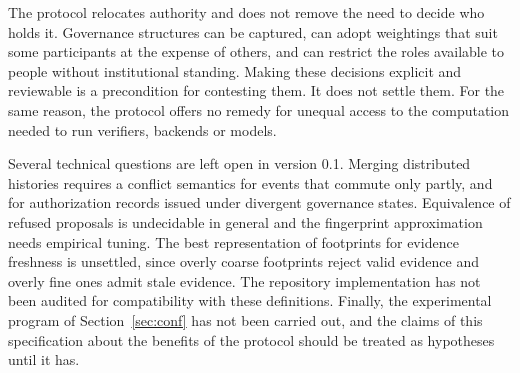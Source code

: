 \documentclass[11pt]{article}
\theoremstyle{remark}
\begin{document}
The protocol relocates authority and does not remove the need to decide who holds it. Governance structures can be captured, can adopt weightings that suit some participants at the expense of others, and can restrict the roles available to people without institutional standing. Making these decisions explicit and reviewable is a precondition for contesting them. It does not settle them. For the same reason, the protocol offers no remedy for unequal access to the computation needed to run verifiers, backends or models.

Several technical questions are left open in version 0.1. Merging distributed histories requires a conflict semantics for events that commute only partly, and for authorization records issued under divergent governance states. Equivalence of refused proposals is undecidable in general and the fingerprint approximation needs empirical tuning. The best representation of footprints for evidence freshness is unsettled, since overly coarse footprints reject valid evidence and overly fine ones admit stale evidence. The repository implementation has not been audited for compatibility with these definitions. Finally, the experimental program of Section~\ref{sec:conf} has not been carried out, and the claims of this specification about the benefits of the protocol should be treated as hypotheses until it has.
\end{document}
